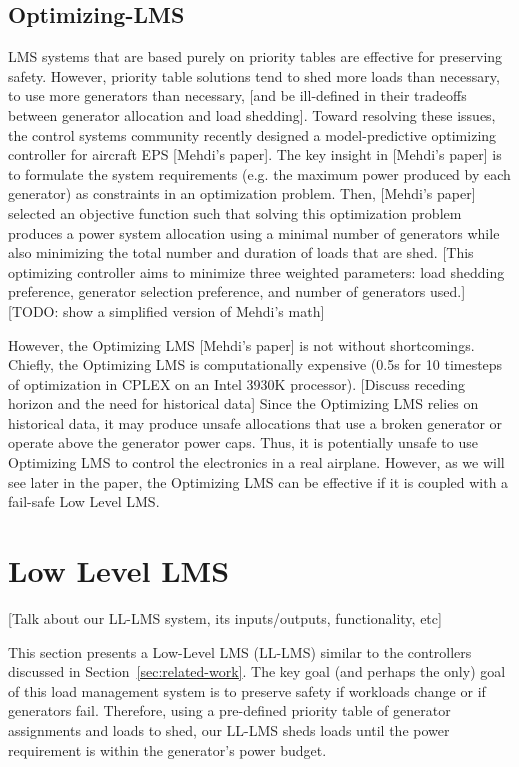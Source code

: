 \documentclass{acm_proc_article-sp}
\begin{document}
\subsection{Optimizing-LMS}
\label{sec:optimizing-LMS}
LMS systems that are based purely on priority tables are effective for preserving safety.
However, priority table solutions tend to shed more loads than necessary, to use more generators than necessary, [and be ill-defined in their tradeoffs between generator allocation and load shedding].
Toward resolving these issues, the control systems community recently designed a model-predictive optimizing controller for aircraft EPS [Mehdi's paper].
The key insight in [Mehdi's paper] is to formulate the system requirements (e.g. the maximum power produced by each generator) as constraints in an optimization problem.
Then, [Mehdi's paper] selected an objective function such that solving this optimization problem produces a power system allocation using a minimal number of generators while also minimizing the total number and duration of loads that are shed. 
[This optimizing controller aims to minimize three weighted parameters: load shedding preference, generator selection preference, and number of generators used.]
[TODO: show a simplified version of Mehdi's math]

However, the Optimizing LMS [Mehdi's paper] is not without shortcomings.
Chiefly, the Optimizing LMS is computationally expensive (0.5s for 10 timesteps of optimization in CPLEX on an Intel 3930K processor).
[Discuss receding horizon and the need for historical data]
Since the Optimizing LMS relies on historical data, it may produce unsafe allocations that use a broken generator or operate above the generator power caps.
Thus, it is potentially unsafe to use Optimizing LMS to control the electronics in a real airplane. 
However, as we will see later in the paper, the Optimizing LMS can be effective if it is coupled with a fail-safe Low Level LMS.

\section{Low Level LMS}
[Talk about our LL-LMS system, its inputs/outputs, functionality, etc]

This section presents a Low-Level LMS (LL-LMS) similar to the controllers discussed in Section~\ref{sec:related-work}.
The key goal (and perhaps the only) goal of this load management system is to preserve safety if workloads change or if  generators fail.
Therefore, using a pre-defined priority table of generator assignments and loads to shed, our LL-LMS sheds loads until the power requirement is within the generator's power budget.
\end{document}
